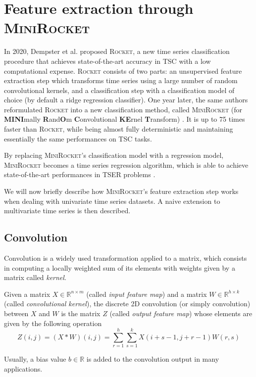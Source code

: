 \section{Feature extraction through \textsc{MiniRocket}}
\label{sec:minirocket}
In 2020, Dempster et al. \cite{rocket} proposed \textsc{Rocket}, a new time series classification procedure that achieves state-of-the-art accuracy in TSC with a low computational expense. \textsc{Rocket} consists of two parts: an unsupervised feature extraction step which transforms time series using a large number of random convolutional kernels, and a classification step with a classification model of choice (by default a ridge regression classifier).
One year later, the same authors reformulated \textsc{Rocket} into a new classification method, called \textsc{MiniRocket} (for \textbf{MINI}mally \textbf{R}and\textbf{O}m \textbf{C}onvolutional \textbf{KE}rnel \textbf{T}ransform) \cite{minirocket}. It is up to 75 times faster than \textsc{Rocket}, while being almost fully deterministic and maintaining essentially the same performances on TSC tasks.

By replacing \textsc{MiniRocket}'s classification model with a regression model, \textsc{MiniRocket} becomes a time series regression algorithm, which is able to achieve state-of-the-art performances in TSER problems \cite{TSER}.

We will now briefly describe how \textsc{MiniRocket}'s feature extraction step works when dealing with univariate time series datasets. A naive extension to multivariate time series is then described.



\subsection{Convolution}
\label{sec:convolution}
Convolution is a widely used transformation applied to a matrix, which consists in computing a locally weighted sum of its elements with weights given by a matrix called \textit{kernel}.

\begin{definition}
Given a matrix $X \in \mathbb{R}^{n\times m}$ (called \textit{input feature map}) and a matrix $W \in \mathbb{R}^{h\times k}$ (called \textit{convolutional kernel}), the discrete 2D convolution (or simply convolution) between $X$ and $W$ is the matrix $Z$ (called \textit{output feature map}) whose elements are given by the following operation
\[
Z(i,j) = (X*W)(i,j) = \sum_{r=1}^h \sum_{s=1}^k X(i+s-1, j+r-1) W(r, s)
\]
\end{definition}
Usually, a bias value $b\in\mathbb{R}$ is added to the convolution output in many applications.

